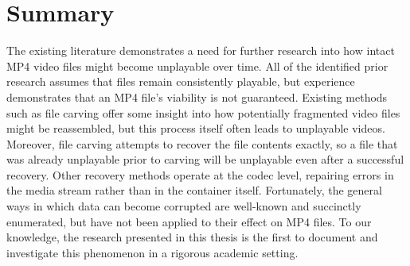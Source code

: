 \section{Summary}

The existing literature demonstrates a need for further research into how intact MP4 video files might become unplayable over time. All of the identified prior research assumes that files remain consistently playable, but experience demonstrates that an MP4 file's viability is not guaranteed. Existing methods such as file carving offer some insight into how potentially fragmented video files might be reassembled, but this process itself often leads to unplayable videos. Moreover, file carving attempts to recover the file contents exactly, so a file that was already unplayable prior to carving will be unplayable even after a successful recovery. Other recovery methods operate at the codec level, repairing errors in the media stream rather than in the container itself. Fortunately, the general ways in which data can become corrupted are well-known and succinctly enumerated, but have not been applied to their effect on MP4 files. To our knowledge, the research presented in this thesis is the first to document and investigate this phenomenon in a rigorous academic setting.
